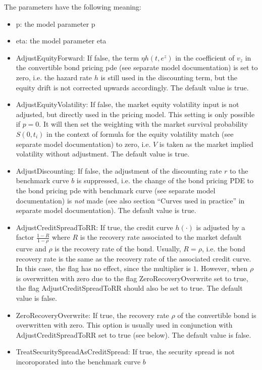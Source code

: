 The parameters have the following meaning:

\begin{itemize}
\item p: the model parameter p
\item eta: the model parameter eta
\item AdjustEquityForward: If false, the term $\eta h(t,e^z)$ in the coefficient of $v_z$ in the convertible bond
  pricing pde (see separate model documentation) is set to zero, i.e. the hazard rate $h$ is still used in the
  discounting term, but the equity drift is not corrected upwards accordingly. The default value is true.
\item AdjustEquityVolatility: If false, the market equity volatility input is not adjusted, but directly used in the
  pricing model. This setting is only possible if $p=0$. It will then set the weighting with the market survival
  probability $S(0,t_i)$ in the context of formula for the equity volatility match (see separate model documentation) to
  zero, i.e. $V$ is taken as the market implied volatility without adjustment. The default value is true.
\item AdjustDiscounting: If false, the adjustment of the discounting rate $r$ to the benchmark curve $b$ is suppressed,
  i.e. the change of the bond pricing PDE to the bond pricing pde with benchmark curve (see separate model
  documentation) is {\em not} made (see also section ``Curves used in practice'' in separate model documentation). The
  default value is true.
\item AdjustCreditSpreadToRR: If true, the credit curve $h(\cdot)$ is adjusted by a factor $\frac{1-R}{1-\rho}$ where
  $R$ is the recovery rate associated to the market default curve and $\rho$ is the recovery rate of the bond. Usually,
  $R=\rho$, i.e. the bond recovery rate is the same as the recovery rate of the associated credit curve. In this case,
  the flag has no effect, since the multiplier is $1$. However, when $\rho$ is overwritten with zero due to the flag
  ZeroRecoveryOverwrite set to true, the flag AdjustCreditSpreadToRR should also be set to true. The default value is
  false.
\item ZeroRecoveryOverwrite: If true, the recovery rate $\rho$ of the convertible bond is overwritten with zero. This
  option is usually used in conjunction with AdjustCreditSpreadToRR set to true (see below). The default value is false.
\item TreatSecuritySpreadAsCreditSpread: If true, the security spread is not incoroporated into the benchmark curve $b$

\end{itemize}
